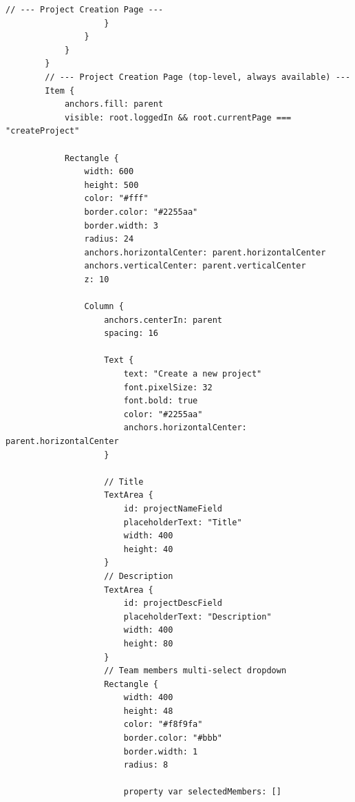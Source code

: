 \documentclass{report}
\begin{document}
\begin{lstlisting}[style=qmlstyle]
                        // --- Project Creation Page ---
                    }
                }
            }
        }
        // --- Project Creation Page (top-level, always available) ---
        Item {
            anchors.fill: parent
            visible: root.loggedIn && root.currentPage === "createProject"
    
            Rectangle {
                width: 600
                height: 500
                color: "#fff"
                border.color: "#2255aa"
                border.width: 3
                radius: 24
                anchors.horizontalCenter: parent.horizontalCenter
                anchors.verticalCenter: parent.verticalCenter
                z: 10
    
                Column {
                    anchors.centerIn: parent
                    spacing: 16
    
                    Text {
                        text: "Create a new project"
                        font.pixelSize: 32
                        font.bold: true
                        color: "#2255aa"
                        anchors.horizontalCenter: parent.horizontalCenter
                    }
    
                    // Title
                    TextArea {
                        id: projectNameField
                        placeholderText: "Title"
                        width: 400
                        height: 40
                    }
                    // Description
                    TextArea {
                        id: projectDescField
                        placeholderText: "Description"
                        width: 400
                        height: 80
                    }
                    // Team members multi-select dropdown
                    Rectangle {
                        width: 400
                        height: 48
                        color: "#f8f9fa"
                        border.color: "#bbb"
                        border.width: 1
                        radius: 8
    
                        property var selectedMembers: []
    

\end{lstlisting}
\end{document}
